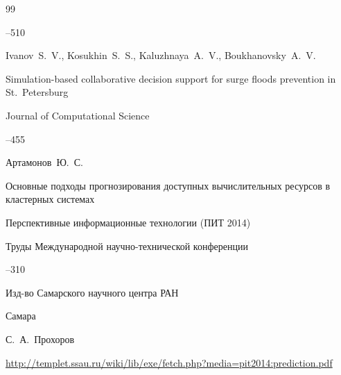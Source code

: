 \begin{thebibliography}{99}




--510






\by Ivanov~S.~V., Kosukhin~S.~S., Kaluzhnaya~A.~V., Boukhanovsky~A.~V.

\paper Simulation-based collaborative decision support for surge floods prevention  in St.~Petersburg 

\jour Journal of Computational Science




--455









\by Артамонов~Ю.~С.

\paper Основные подходы прогнозирования доступных вычислительных ресурсов в кластерных системах

\inbook Перспективные информационные технологии (ПИТ 2014)

\bookinfo Труды Международной научно-технической конференции


--310

\publ Изд-во Самарского научного центра РАН

\publaddr Самара

\ed С.~А.~Прохоров

\elink \url{http://templet.ssau.ru/wiki/lib/exe/fetch.php?media=pit2014:prediction.pdf}







\end{thebibliography}
